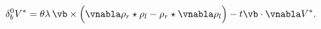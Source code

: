 \begin{equation}
     \delta^0_{b}V^*=
     {\theta}\lambda\,\vb\times\Big(
     \vnabla\rho_{r}\star\rho_{l}
     -\rho_{r}\star\vnabla\rho_{l}
     \Big)-t\vb\cdot\vnabla V^*.
     \label{Vstarchange}
\end{equation}

